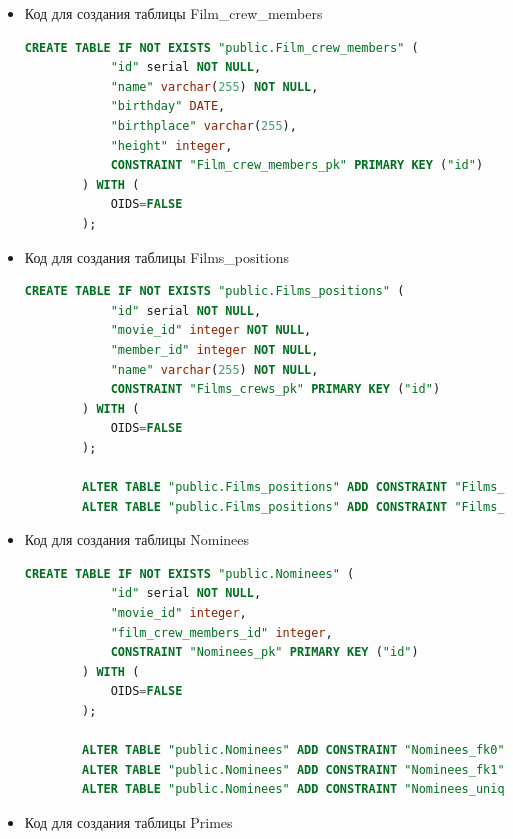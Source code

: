 \documentclass[a4paper,12pt]{article}
\renewcommand{\^}[2]{#1^{\, #2} \kern -1pt}
\newcommand{\1}{\kern 1pt}
\newcommand{\0}{\kern -1pt}
\begin{document}
\begin{itemize}
	\item Код для создания таблицы Film\_crew\_members
	
	\begin{lstlisting}[style=vscode-dark, language=SQL, label={lst:sql5}]
		CREATE TABLE IF NOT EXISTS "public.Film_crew_members" (
			"id" serial NOT NULL,
			"name" varchar(255) NOT NULL,
			"birthday" DATE,
			"birthplace" varchar(255),
			"height" integer,
			CONSTRAINT "Film_crew_members_pk" PRIMARY KEY ("id")
		) WITH (
			OIDS=FALSE
		);
	\end{lstlisting}

	\item Код для создания таблицы Films\_positions

	\begin{lstlisting}[style=vscode-dark, language=SQL, label={lst:sql6}]
		CREATE TABLE IF NOT EXISTS "public.Films_positions" (
			"id" serial NOT NULL,
			"movie_id" integer NOT NULL,
			"member_id" integer NOT NULL,
			"name" varchar(255) NOT NULL,
			CONSTRAINT "Films_crews_pk" PRIMARY KEY ("id")
		) WITH (
			OIDS=FALSE
		);
		
		ALTER TABLE "public.Films_positions" ADD CONSTRAINT "Films_positions_fk0" FOREIGN KEY ("movie_id") REFERENCES "public.Movies"("id");
		ALTER TABLE "public.Films_positions" ADD CONSTRAINT "Films_positions_fk1" FOREIGN KEY ("member_id") REFERENCES "public.Film_crew_members"("id");
	\end{lstlisting}
	\newpage
	
	\item Код для создания таблицы Nominees
	
	\begin{lstlisting}[style=vscode-dark, language=SQL, label={lst:sql7}]
		CREATE TABLE IF NOT EXISTS "public.Nominees" (
			"id" serial NOT NULL,
			"movie_id" integer,
			"film_crew_members_id" integer,
			CONSTRAINT "Nominees_pk" PRIMARY KEY ("id")
		) WITH (
			OIDS=FALSE
		);
		
		ALTER TABLE "public.Nominees" ADD CONSTRAINT "Nominees_fk0" FOREIGN KEY ("movie_id") REFERENCES "public.Movies"("id");
		ALTER TABLE "public.Nominees" ADD CONSTRAINT "Nominees_fk1" FOREIGN KEY ("film_crew_members_id") REFERENCES "public.Film_crew_members"("id");
		ALTER TABLE "public.Nominees" ADD CONSTRAINT "Nominees_unique" UNIQUE("movie_id","film_crew_members_id");
	\end{lstlisting}
	
	\item Код для создания таблицы Primes
	

\end{itemize}
\end{document}
